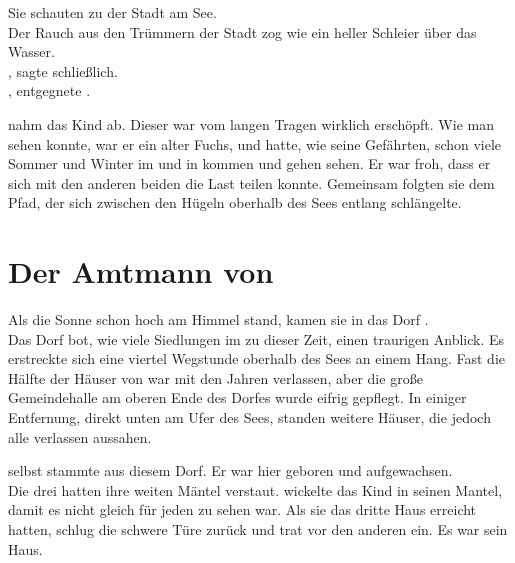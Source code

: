 \begin{huge}
Sie schauten zu der Stadt am See.\\
Der Rauch aus den Trümmern der Stadt {\Tern} zog wie ein heller Schleier über das Wasser.\\
, sagte {\Nox} schließlich.  
\\
, entgegnete {\Bomar}.\\

{\Bomar} nahm {\Eno} das Kind ab. Dieser war vom langen Tragen wirklich erschöpft. Wie man sehen konnte, war er ein alter Fuchs, und hatte, wie seine Gefährten, schon viele Sommer und Winter im {\Enland} und in {\Rhingell} kommen und gehen sehen. Er war froh, dass er sich mit den anderen beiden die Last teilen konnte. Gemeinsam folgten sie dem Pfad, der sich zwischen den Hügeln oberhalb des Sees entlang schlängelte.

\chapter{Der Amtmann von {\Berna}}
Als die Sonne schon hoch am Himmel stand, kamen sie in das Dorf {\Berna}.\\
Das Dorf bot, wie viele Siedlungen im {\Enland} zu dieser Zeit, einen traurigen Anblick. Es erstreckte sich eine viertel Wegstunde oberhalb des Sees an einem Hang. Fast die Hälfte der Häuser von {\Berna} war mit den Jahren verlassen, aber die große Gemeindehalle am oberen Ende des Dorfes wurde eifrig gepflegt. In einiger Entfernung, direkt unten am Ufer des Sees, standen weitere Häuser, die jedoch alle verlassen aussahen.

{\Bomar} selbst stammte aus diesem Dorf. Er war hier geboren und aufgewachsen.\\
Die drei {\Schattenlaufer} hatten ihre weiten Mäntel verstaut. {\Eno} wickelte das Kind in seinen Mantel, damit es nicht gleich für jeden zu sehen war. Als sie das dritte Haus erreicht hatten, schlug {\Bomar} die schwere Türe zurück und trat vor den anderen ein. Es war sein Haus.


\end{huge}
